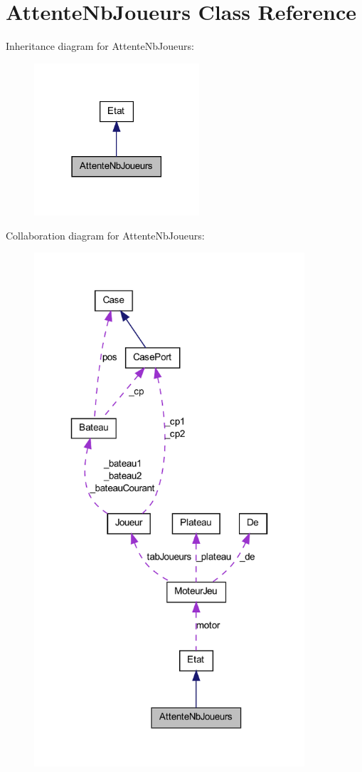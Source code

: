 \hypertarget{class_attente_nb_joueurs}{
\section{AttenteNbJoueurs Class Reference}
\label{class_attente_nb_joueurs}
}


Inheritance diagram for AttenteNbJoueurs:
\nopagebreak
\begin{figure}[H]
\begin{center}
\leavevmode
\includegraphics[width=174pt]{class_attente_nb_joueurs__inherit__graph}
\end{center}
\end{figure}


Collaboration diagram for AttenteNbJoueurs:
\nopagebreak
\begin{figure}[H]
\begin{center}
\leavevmode
\includegraphics[width=285pt]{class_attente_nb_joueurs__coll__graph}
\end{center}
\end{figure}
